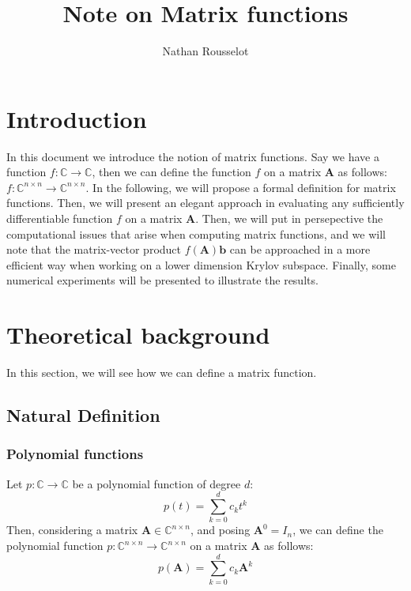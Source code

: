 \documentclass[11pt]{article}
\title{Note on Matrix functions} %
\author{Nathan Rousselot}
\numberwithin{equation}{section}
\begin{document}
\maketitle
\tableofcontents

\section{Introduction}
In this document we introduce the notion of matrix functions. Say we have a function $f:\mathbb{C}\rightarrow\mathbb{C}$, then we can define the function $f$ on a matrix $\mathbf{A}$ as follows: $f:\mathbb{C}^{n\times n}\rightarrow\mathbb{C}^{n\times n}$. In the following, we will propose a formal definition for matrix functions. Then, we will present an elegant approach in evaluating any sufficiently differentiable function $f$ on a matrix $\mathbf{A}$. Then, we will put in persepective the computational issues that arise when computing matrix functions, and we will note that the matrix-vector product $f(\mathbf{A})\mathbf{b}$ can be approached in a more efficient way when working on a lower dimension Krylov subspace. Finally, some numerical experiments will be presented to illustrate the results.

\section{Theoretical background}
In this section, we will see how we can define a matrix function.
\subsection{Natural Definition}
\subsubsection*{Polynomial functions}
Let $p:\mathbb{C}\rightarrow\mathbb{C}$ be a polynomial function of degree $d$:
\begin{equation}
    p(t) = \sum_{k=0}^d c_k t^k
\end{equation}
Then, considering a matrix $\mathbf{A}\in\mathbb{C}^{n\times n}$, and posing $\mathbf{A}^0 = I_n$, we can define the polynomial function $p:\mathbb{C}^{n\times n}\rightarrow\mathbb{C}^{n\times n}$ on a matrix $\mathbf{A}$ as follows:
\begin{equation}
    p(\mathbf{A}) = \sum_{k=0}^d c_k \mathbf{A}^k
\end{equation}
\end{document}
